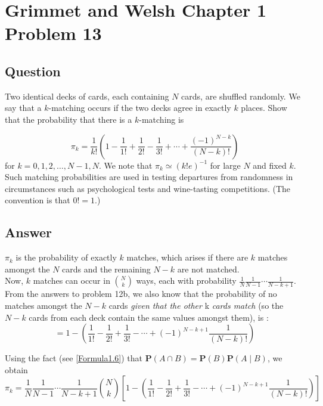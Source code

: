 \section{Grimmet and Welsh Chapter 1 Problem 13}
\subsection{Question}

Two identical decks of cards, each containing $N$ cards, are shuffled randomly. We say that a $k$-matching occurs if the two decks agree in exactly $k$ places.
Show that the probability that there is a $k$-matching is 

\begin{equation}
\pi_k = \frac{1}{k!}\left(1 - \frac{1}{1!} + \frac{1}{2!} - \frac{1}{3!} + \cdots + \frac{(-1)^{N-k}}{(N-k)!}\right) 
\end{equation}
for $k = 0, 1, 2, \ldots , N-1, N$. 
We note that $\pi_k \simeq (k!e)^{-1} $ for large $N$ and fixed $k$. Such matching probabilities are used in testing departures from randomness
in circumstances such as psychological tests and wine-tasting competitions. (The convention is that $0! = 1$.) 

\subsection{Answer}

$\pi_k$ is the probability of exactly $k$ matches, which arises if there are $k$ matches amongst the $N$ cards and the remaining $N-k$ are not matched. \\
Now, $k$ matches can occur in $\binom{N}{k}$ ways, each with probability $\frac{1}{N}\frac{1}{N-1}\cdots \frac{1}{N-k+1}$. \\ 
From the answers to problem 12b, we also know that the probability of no matches amongst the $N-k$ cards \emph{given that the other } k \emph{cards match} 
(so the $N-k$ cards from each deck contain the same values amongst them), is :  
 \begin{equation*} 
= 1 - \left(\frac{1}{1!} -  \frac{1}{2!} + \frac{1}{3!} - \cdots  +  (-1)^{N-k+1}\frac{1}{(N-k)!}\right)
\end{equation*}

Using the fact (see \eqref{Formula1.6}) that $\mathbf{P}(A \cap B) = \mathbf{P}(B) \mathbf{P} (A \mid B)$, we obtain
\begin{equation*} 
\pi_k =  \frac{1}{N}\frac{1}{N-1}\cdots \frac{1}{N-k+1}   \binom{N}{k}  \left[ 1 - \left(\frac{1}{1!} -  \frac{1}{2!} + \frac{1}{3!} - \cdots  +  (-1)^{N-k+1}\frac{1}{(N-k)!}\right)\right] 
\end{equation*} 

